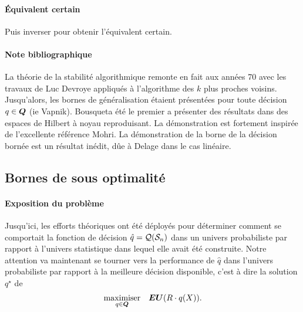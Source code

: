 \paragraph{Équivalent certain}

Puis inverser pour obtenir l'équivalent certain.

\paragraph{Note bibliographique}

La théorie de la stabilité algorithmique remonte en fait aux années 70 avec les travaux de
Luc Devroye appliqués à l'algorithme des $k$ plus proches voisins\cit. Jusqu'alors, les
bornes de généralisation étaient présentées pour toute décision $q \in \Q$ (ie
Vapnik). Bousquet\cit a été le premier a présenter des résultats dans des espaces de
Hilbert à noyau reproduisant. La démonstration est fortement inspirée de l'excellente
référence Mohri\cit. La démonstration de la borne de la décision bornée est un résultat
inédit, dûe à Delage dans le cas linéaire.


\subsection{Bornes de sous optimalité}


\paragraph{Exposition du problème}

Jusqu'ici, les efforts théoriques ont été déployés pour déterminer comment se comportait
la fonction de décision $\hat q = \alg(\S_n)$ dans un univers probabiliste par rapport à
l'univers statistique dans lequel elle avait été construite. Notre attention va maintenant
se tourner vers la performance de $\hat q$ dans l'univers probabiliste par rapport à la
meilleure décision disponible, c'est à dire la solution $q^\star$ de 
\begin{equation}
  \maximizeEquation[q \in \Q]{\EU(R \cdot q(X)).}
\end{equation}


